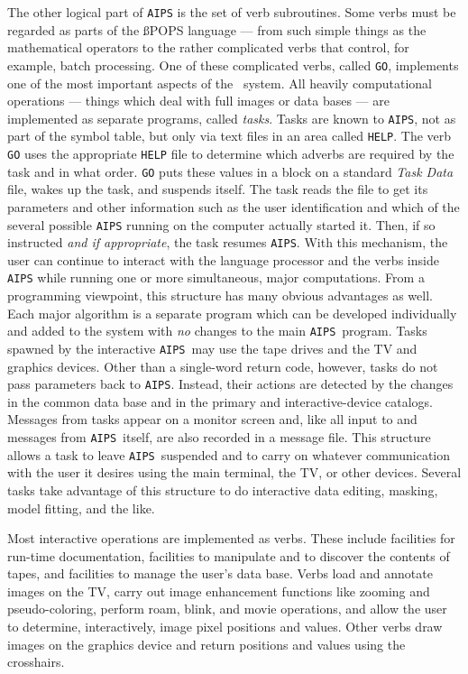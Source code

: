      The other logical part of {\tt AIPS} is the set of verb
subroutines.  Some verbs must be regarded as parts of the {\ss POPS}
language --- from such simple things as the mathematical operators
to the rather complicated verbs that control, for example, batch
processing.  One of these complicated verbs, called {\tt GO},
implements one of the most important aspects of the \AIPS\ system.
All heavily computational operations --- things which deal with full
images or data bases --- are implemented as separate programs, called
{\it tasks}.  Tasks are known to {\tt AIPS}, not as part of the symbol
table, but only via text files in an area called \hbox{{\tt HELP}}.  The
verb {\tt GO} uses the appropriate {\tt HELP} file to determine
which adverbs are required by the task and in what order.  {\tt GO}
puts these values in a block on a standard {\it Task Data} file,
wakes up the task, and suspends itself.  The task reads the file
to get its parameters and other information such as the user identification
and which  of the several possible {\tt AIPS} running on the computer
actually started it.  Then, if so instructed {\it and if appropriate},
the task resumes \hbox{{\tt AIPS}}.
With this mechanism, the user can continue to interact with the language
processor and the verbs inside {\tt AIPS} while running one or more
simultaneous, major computations.  From a programming viewpoint, this
structure has many obvious advantages as well.  Each major algorithm
is a separate program which can be developed individually and added to
the system with {\it no} changes to the main {\tt AIPS}\ program.  Tasks
spawned by the interactive {\tt AIPS}\ may use the tape drives and the
TV and graphics devices.  Other than a single-word return code, however,
tasks do not pass parameters back to \hbox{{\tt AIPS}}.  Instead, their
actions are detected by the changes in the common data base and in the primary
and interactive-device catalogs.  Messages from tasks appear on a
monitor screen and, like all input to and messages from {\tt AIPS}\
itself, are also recorded in a message file.  This structure allows a
task to leave {\tt AIPS}\ suspended and to carry on whatever
communication with the user it desires using the main terminal, the
TV, or other devices.  Several tasks take advantage of this structure
to do interactive data editing, masking, model fitting, and the like.

     Most interactive operations are implemented as verbs.  These
include facilities for run-time documentation, facilities to manipulate
and to discover the contents of tapes, and facilities to manage the
user's data base.  Verbs load and annotate images on the TV, carry
out image enhancement functions like zooming and pseudo-coloring,
perform roam, blink, and movie operations, and allow the user to
determine, interactively, image pixel positions and values.  Other
verbs draw images on the graphics device and return positions and
values using the crosshairs.

